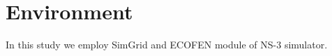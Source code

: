\chapter{Environment}
\label{chapter:environment}
In this study we employ SimGrid and ECOFEN module of NS-3 simulator. 